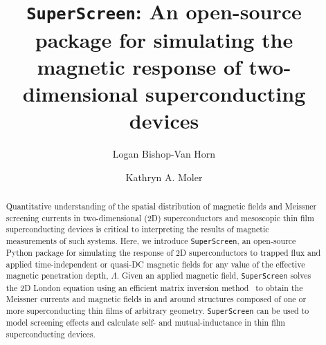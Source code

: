 \documentclass[final,3p,times,twocolumn]{elsarticle}
\newcommand{\inline}[1]{\texttt{#1}\xspace}
\newcommand{\SuperScreen}{\inline{SuperScreen}}
\begin{document}
\begin{frontmatter}



\title{\SuperScreen: An open-source package for simulating the magnetic response of two-dimensional superconducting devices}


\author[PHYS,SIMES]{Logan Bishop-Van Horn}
\author[PHYS,AP,SIMES]{Kathryn A. Moler}


\address[PHYS]{Department of Physics, Stanford University, Stanford, California 94305, USA}
\address[AP]{Department of Applied Physics, Stanford University, Stanford, California 94305, USA}
\address[SIMES]{Stanford Institute for Materials and Energy Sciences, SLAC National Accelerator Laboratory, 2575 Sand Hill Road, Menlo Park, California 94025, USA}

\begin{abstract}
Quantitative understanding of the spatial distribution of magnetic fields and Meissner screening currents in two-dimensional (2D) superconductors and mesoscopic thin film superconducting devices is critical to interpreting the results of magnetic measurements of such systems. Here, we introduce \SuperScreen, an open-source Python package for simulating the response of 2D superconductors to trapped flux and applied time-independent or quasi-DC magnetic fields for any value of the effective magnetic penetration depth, $\Lambda$. Given an applied magnetic field, \SuperScreen solves the 2D London equation using an efficient matrix inversion method~\cite{Brandt2004-ew, Brandt2005-wj} to obtain the Meissner currents and magnetic fields in and around structures composed of one or more superconducting thin films of arbitrary geometry. \SuperScreen can be used to model screening effects and calculate self- and mutual-inductance in thin film superconducting devices.
\end{abstract}


\end{frontmatter}
\end{document}
